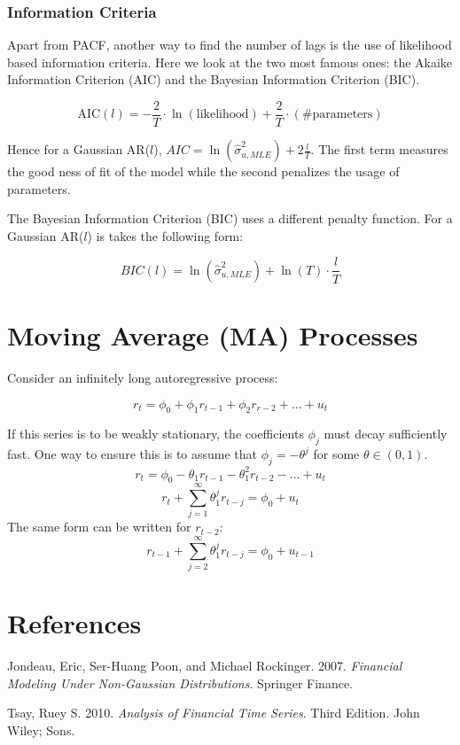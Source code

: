 \documentclass[11pt,]{article}
\begin{document}
\subsubsection{Information Criteria}\label{information-criteria}

Apart from PACF, another way to find the number of lags is the use of
likelihood based information criteria. Here we look at the two most
famous ones: the Akaike Information Criterion (AIC) and the Bayesian
Information Criterion (BIC).

\[\text{AIC}(l) = -\frac{2}{T}\cdot\ln(\text{likelihood})+\frac{2}{T}\cdot(\#\text{parameters})\]

Hence for a Gaussian AR(\(l\)),
\(AIC=\ln(\hat{\sigma}^2_{u,MLE})+2\frac{l}{T}\). The first term
measures the good ness of fit of the model while the second penalizes
the usage of parameters.

The Bayesian Information Criterion (BIC) uses a different penalty
function. For a Gaussian AR(\(l\)) is takes the following form:

\[BIC(l)=\ln(\hat{\sigma}^2_{u,MLE})+\ln(T)\cdot \frac{l}{T}\]

\section{Moving Average (MA)
Processes}\label{moving-average-ma-processes}

Consider an infinitely long autoregressive process:

\[r_t = \phi_0+\phi_1r_{t-1}+\phi_2r_{r-2}+\hdots+u_t\]

If this series is to be weakly stationary, the coefficients \(\phi_j\)
must decay sufficiently fast. One way to ensure this is to assume that
\(\phi_j=-\theta^j\) for some \(\theta\in(0,1)\).
\[r_t = \phi_0-\theta_1r_{t-1}-\theta_1^2r_{t-2}-\hdots+u_t\]
\[r_t+\sum_{j=1}^\infty \theta_1^jr_{t-j}=\phi_0+u_t\] The same form can
be written for \(r_{t-2}\):
\[r_{t-1}+\sum_{j=2}^\infty \theta_1^jr_{t-j}=\phi_0+u_{t-1}\]

\section*{References}\label{references}

\hypertarget{refs}{}
\hypertarget{ref-Jondeau_Poon_Rockinger:2007}{}
Jondeau, Eric, Ser-Huang Poon, and Michael Rockinger. 2007.
\emph{Financial Modeling Under Non-Gaussian Distributions}. Springer
Finance.

\hypertarget{ref-Tsay:2010}{}
Tsay, Ruey S. 2010. \emph{Analysis of Financial Time Series}. Third
Edition. John Wiley; Sons.
\end{document}
